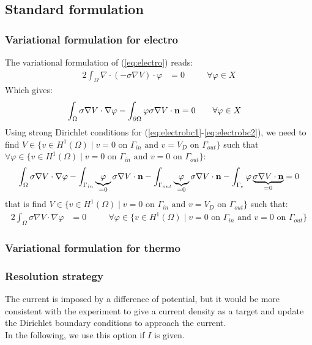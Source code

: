 \subsection{Standard formulation}
\subsubsection{Variational formulation for electro}
The variational formulation of (\ref{eq:electro}) reads:
\begin{alignat}{2}
  \int_\Omega \nabla\cdot(-\sigma\nabla V)\cdot\varphi &= 0
  && \quad \forall\varphi\in X
\end{alignat}
Which gives:
\begin{alignat}{2}
  \int_\Omega \sigma\nabla V\cdot\nabla\varphi
  - \int_{\partial\Omega} \varphi\sigma\nabla V\cdot \mathbf{n} &= 0
  && \quad \forall\varphi\in X
\end{alignat}
Using strong Dirichlet conditions for (\ref{eq:electrobc1}-\ref{eq:electrobc2}),
we need to find $V \in \{ v \in H^1(\Omega) \mid v = 0 \text{ on } \Gamma_{in}
\text{ and } v = V_D \text{ on } \Gamma_{out} \}$ such that $\forall \varphi
\in \{ v \in H^1(\Omega) \mid v = 0 \text{ on } \Gamma_{in} \text{ and } v = 0
\text{ on } \Gamma_{out} \}$:
\begin{equation*}
  \int_\Omega \sigma\nabla V\cdot\nabla\varphi
  - \int_{\Gamma_{in}} \underbrace{\varphi}_{=0}\sigma\nabla V\cdot \mathbf{n}
  - \int_{\Gamma_{out}} \underbrace{\varphi}_{=0}\sigma\nabla V\cdot \mathbf{n}
  - \int_{\Gamma_e} \varphi\underbrace{\sigma\nabla V\cdot \mathbf{n}}_{=0} = 0
\end{equation*}
that is find $V \in \{ v \in H^1(\Omega) \mid v = 0 \text{ on } \Gamma_{in}
\text{ and } v = V_D \text{ on } \Gamma_{out} \}$ such that:
\begin{alignat}{2}
  \label{eq:vf-electrostrong}
  \int_\Omega \sigma\nabla V\cdot\nabla\varphi &= 0
  && \quad \forall \varphi \in \{ v \in H^1(\Omega) \mid v = 0 \text{ on }
  \Gamma_{in} \text{ and } v = 0 \text{ on } \Gamma_{out} \}
\end{alignat}

\subsubsection{Variational formulation for thermo}

\subsubsection{Resolution strategy}
The current is imposed by a difference of potential, but it would be more
consistent with the experiment to give a current density as a target and
update the Dirichlet boundary conditions to approach the current.\\
In the following, we use this option if $I$ is given.

